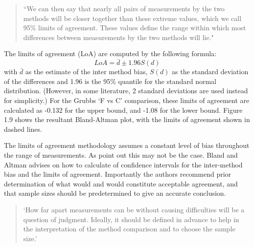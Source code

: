 \documentclass[12pt, a4paper]{report}
\theoremstyle{plain}
\theoremstyle{definition}
\theoremstyle{remark}
\begin{document}
	\begin{quote} ``We can then say that nearly all pairs
		of measurements by the two methods will be closer together than
		these extreme values, which we call 95\% limits of agreement.
		These values define the range within which most differences
		between measurements by the two methods will lie."
	\end{quote}
	
	The limits of agreement (LoA) are computed by the following
	formula:
	\begin{equation}
	LoA = \bar{d} \pm 1.96 S(d)
	\end{equation}
	with $\bar{d}$ as the estimate of the inter method bias, $S(d)$ as
	the standard deviation of the differences and 1.96 is the 95\%
	quantile for the standard normal distribution. (However, in some
	literature, 2 standard deviations are used instead for
	simplicity.) For the Grubbs `F vs C' comparison, these limits of
	agreement are calculated as -0.132 for the upper bound, and -1.08
	for the lower bound. Figure 1.9 shows the resultant Bland-Altman
	plot, with the limits of agreement shown in dashed lines.
	
	
	The limits of agreement methodology assumes a constant level of
	bias throughout the range of measurements. As \citet*{BA86} point
	out this may not be the case. Bland and Altman advises on how to
	calculate of confidence intervals for the inter-method bias and
	the limits of agreement. Importantly the authors recommend prior
	determination of what would and would constitute acceptable
	agreement, and that sample sizes should be predetermined to give
	an accurate conclusion.
	
	\begin{quote}
		`How far apart measurements can be without causing difficulties
		will be a question of judgment. Ideally, it should be defined in
		advance to help in the interpretation of the method comparison and
		to choose the sample size.'\citep{BA86}
	\end{quote}
	
\end{document}
